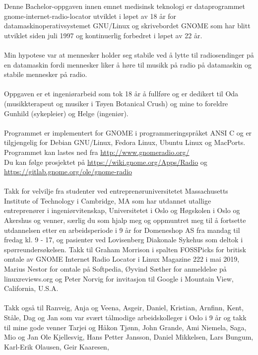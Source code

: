 \documentclass[a4paper,norsk,utf8]{report}
\begin{document}
\noindent Denne Bachelor-oppgaven innen emnet medisinsk teknologi er
dataprogrammet
gnome-internet-radio-locator
utviklet i løpet av 18 år for datamaskinoperativsystemet GNU/Linux og
skrivebordet GNOME som har blitt utviklet siden juli 1997 og
kontinuerlig forbedret i løpet av 22 år.
\\
\\
Min hypotese var at mennesker holder seg stabile ved å lytte til
radiosendinger på en datamaskin fordi mennesker liker å høre til
musikk på radio på datamaskin og stabile mennesker på radio.
\\
\\
\noindent Oppgaven er et ingeniørarbeid som tok 18 år å fullføre og er dedikert
til Oda (musikkterapeut og musiker i Tøyen Botanical Crush) og mine to foreldre Gunhild (sykepleier) og
Helge (ingeniør).
\\
\\
Programmet er implementert for GNOME i programmeringspråket ANSI C og
er tilgjengelig for Debian GNU/Linux, Fedora Linux, Ubuntu Linux og
MacPorts.  Programmet kan lastes ned fra
\url{http://www.gnomeradio.org/}\\
\noindent Du kan følge prosjektet på
\url{https://wiki.gnome.org/Apps/Radio} og
\url{https://gitlab.gnome.org/ole/gnome-radio}
\\
\\
Takk for velvilje fra studenter ved entreprenøruniversitetet Massachusetts Institute of
Technology i Cambridge, MA som har utdannet utallige entreprenører i ingeniørvitenskap, 
Universitetet i Oslo og Høgskolen i Oslo og Akershus og
venner, særlig du som hjalp meg og oppmuntret meg til å fortsette
utdannelsen etter en arbeidsperiode i 9 år for Domeneshop AS fra
mandag til fredag kl. 9 - 17, og pasienter ved Lovisenberg Diakonale
Sykehus som deltok i spørreundersøkelsen.  Takk til Graham Morrison i
spalten FOSSPicks for britisk omtale av GNOME Internet Radio Locator i Linux
Magazine 222 i mai 2019, Marius Nestor for omtale på Softpedia, Øyvind Sæther
for anmeldelse på linuxreviews.org og Peter Norvig for invitasjon til Google i Mountain View, California, U.S.A.
\\
\\
\noindent Takk også til Ranveig, Anja og Veena, Asgeir, Daniel, Kristian,
Arnfinn, Kent, Ståle, Dag og Jan som var svært tålmodige
arbeidskolleger i Oslo i 9 år og takk til mine gode venner Tarjei og Håkon Tjønn, John Grande, Ami Niemela, Saga, Mio og Jan Ole Kjellesvig, Hans Petter Jansson, Daniel Mikkelsen, Lars Bungum, Karl-Erik Olausen, Geir Kaaresen,
\end{document}
